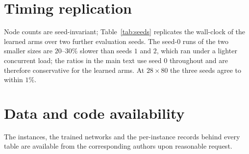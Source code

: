 \documentclass[final,5p,times,twocolumn,authoryear]{elsarticle}
\begin{document}
\section{Timing replication}
\label{app:seeds}

Node counts are seed-invariant; Table~\ref{tab:seeds} replicates the wall-clock of the learned arms over two further evaluation seeds. The seed-$0$ runs of the two smaller sizes are $20$--$30\%$ slower than seeds $1$ and $2$, which ran under a lighter concurrent load; the ratios in the main text use seed $0$ throughout and are therefore conservative for the learned arms. At $28\times80$ the three seeds agree to within $1\%$.

\section*{Data and code availability}
The instances, the trained networks and the per-instance records behind every table are available from the corresponding authors upon reasonable request.



\end{document}
